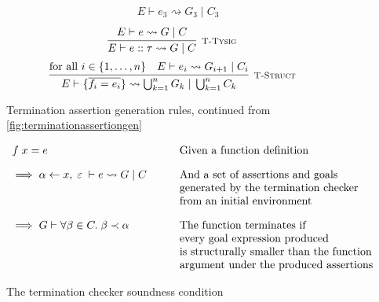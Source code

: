 \begin{figure}
\[{\begin{array}{c}
                \hspace{1em}
                E \vdash e_3 \rightsquigarrow G_3\; |\; C_3
            \end{array}
        }
    \]
    \vspace{10pt}
    \[
        \infer[\textsc{\footnotesize T-Tysig}]{
            E \vdash e :: \tau
                \rightsquigarrow G\; |\; C
        }{
            E \vdash e \rightsquigarrow G\; |\; C
        }
    \]
    \vspace{10pt}
    \[
        \infer[\textsc{\footnotesize T-Struct}]{
            E \vdash \{\overline{f_i = e_i}\}
                \rightsquigarrow \bigcup_{k = 1}^n G_{k}\; |\; \bigcup_{k = 1}^n C_k
        }{
           \text{for all } i \in \{1, \dots, n\}\quad  E \vdash e_i 
                \rightsquigarrow G_{i+1}\; |\; C_i
        }
    \]
    
    \caption{Termination assertion generation rules,
             continued from \autoref{fig:terminationassertiongen}}
    \label{fig:terminationassertiongen2}
\end{figure}


\begin{figure}
    \centering
    \[
        \begin{array}{ll}
            f\; x = e              
                & \text{Given a function definition} \\[10pt]
            \implies \alpha \leftarrow x,\; \varepsilon\; 
                \vdash e \rightsquigarrow G\; |\; C
                \hspace{2em}
                & \text{And a set of assertions and goals} \\
                & \text{generated by the termination checker} \\
                & \text{from an initial environment} \\[10pt]
            \implies G \vdash \forall \beta \in C.\; \beta \prec \alpha
                & \text{The function terminates if} \\
                & \text{every goal expression produced} \\
                & \text{is structurally smaller than the function} \\
                & \text{argument under the produced assertions}
        \end{array}
    \]
    
    \caption{The termination checker soundness condition}
    \label{fig:terminationcondition}
\end{figure}


